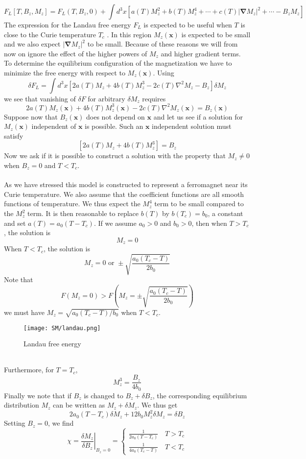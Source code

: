 \[F_L[T,B_z,M_z] = F_L(T,B_z,0) + \int d^3x \left[ a(T)M_z^2 + b(T)M_z^4 + \cdots + c(T)|\bm{\nabla}M_z|^2 + \cdots - B_z M_z \right]\]
The expression for the Landau free energy $F_L$ is expected to be useful when $T$ is close to the Curie temperature $T_c$ . In this region $M_z(\bm{x})$ is expected to be small and we also expect $|\bm{\nabla}M_z|^2$ to be small. 
Because of these reasons we will from now on ignore the effect of the higher powers of $M_z$ and higher gradient terms. 
To determine the equilibrium configuration of the magnetization we have to minimize the free energy with respect to $M_z(\bm{x})$. Using
\[\delta F_L = \int d^3x [2a(T)M_z + 4b(T)M_z^3 - 2c(T)\nabla^2 M_z - B_z]\delta M_z\]
we see that vanishing of $\delta F$ for arbitrary $\delta M_z$ requires
\[2a(T)M_z(\bm{x}) + 4b(T)M_z^3(\bm{x}) - 2c(T)\nabla^2M_z(\bm{x}) = B_z(\bm{x})\]
Suppose now that $B_z(\bm{x})$ does not depend on $\bm{x}$ and let us see if a solution for $M_z(\bm{x})$ independent of $\bm{x}$ is possible. Such an $\bm{x}$ independent solution must satisfy
\[[2a(T)M_z + 4b(T)M_z^3] = B_z\]
Now we ask if it is possible to construct a solution with the property that $M_z \neq 0$ when $B_z = 0$ and $T < T_c$.
\\ \\
As we have stressed this model is constructed to represent a ferromagnet near its Curie temperature. We also assume that the coefficient functions are all smooth functions of temperature. 
We thus expect the $M_z^4$ term to be small compared to the $M_z^2$ term. It is then reasonable to replace $b(T)$ by $b(T_c) = b_0$, a constant and set $a(T) = a_0(T-T_c)$. If we assume $a_0 > 0$ and $b_0 > 0$, then when $T > T_c$, the solution is
\[M_z = 0\]
When $T < T_c$, the solution is
\[M_z = 0 \mbox{ or } \pm \sqrt{\frac{a_0(T_c-T)}{2b_0}}\]
Note that
\[F(M_z = 0) > F(M_z = \pm \sqrt{\frac{a_0(T_c-T)}{2b_0}})\]
we must have $M_z = \sqrt{a_0(T_c-T)/b_0}$ when $T < T_c$.
\begin{figure}[!h]
\centering
\texttt{[image: SM/landau.png]}
\caption{Landau free energy}
\end{figure}
\\
Furthermore, for $T = T_c$,
\[M_z^3 = \frac{B_z}{4b_0}\]
Finally we note that if $B_z$ is changed to $B_z + \delta B_z$, the corresponding equilibrium distribution $M_z$ can be written as $M_z + \delta M_z$. We thus get
\[2a_0(T-T_c)\delta M_z + 12b_0M_z^2\delta M_z = \delta B_z\]
Setting $B_z = 0$, we find
\[\chi = \left. \frac{\delta M_z}{\delta B_z} \right|_{B_z = 0} = \begin{cases} \frac{1}{2a_0(T-T_c)} \quad T>T_c \\ \frac{1}{4a_0(T_c-T)} \quad T<T_c \end{cases} \]
